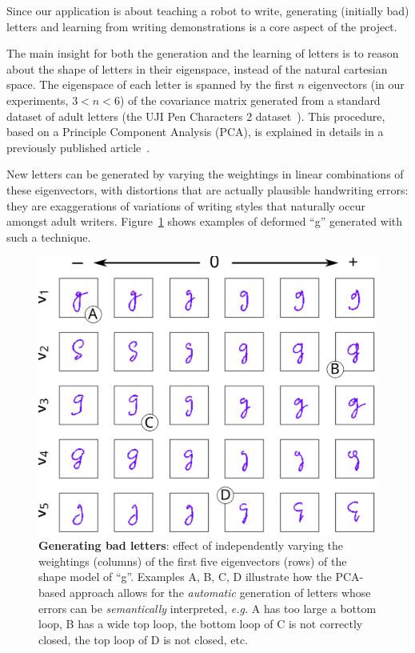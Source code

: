 \documentclass{article}
\newcommand{\eg}{\textit{e.g.}\xspace}
\begin{document}
Since our application is about teaching a robot to write, generating (initially
bad) letters and learning from writing demonstrations is a core aspect of the
project.

The main insight for both the generation and the learning of letters is to
reason about the shape of letters in their eigenspace, instead of the natural
cartesian space. The eigenspace of each letter is spanned by the first $n$
eigenvectors (in our experiments, $3 < n < 6$) of the covariance matrix
generated from a standard dataset of adult letters (the UJI Pen Characters 2
dataset~\cite{Llorens2008}).  This procedure, based on a Principle Component
Analysis (PCA), is explained in details in a previously published
article~\cite{hood2015when}.

New letters can be generated by varying the weightings in linear combinations of
these eigenvectors, with distortions that are actually plausible handwriting errors: 
they are exaggerations of variations of writing styles that naturally occur amongst
adult writers.  Figure~\ref{fig:sampleLetters} shows examples of deformed ``g''
generated with such a technique.

\begin{figure}
    \centering
    \includegraphics[width=0.9\linewidth]{cowriter-g}
    \caption{\small \label{fig:sampleLetters} \textbf{Generating bad letters}:
        effect of independently varying the weightings (columns) of the first five eigenvectors 
        (rows) of the shape model of ``g''. Examples A, B, C, D illustrate how the
        PCA-based approach allows for the \emph{automatic} generation of letters whose
        errors can be \emph{semantically} interpreted, \eg A has too large a bottom
        loop, B has a wide top loop, the bottom loop of C is not correctly
        closed, the top loop of D is not closed, etc.}

\end{figure}
\end{document}
